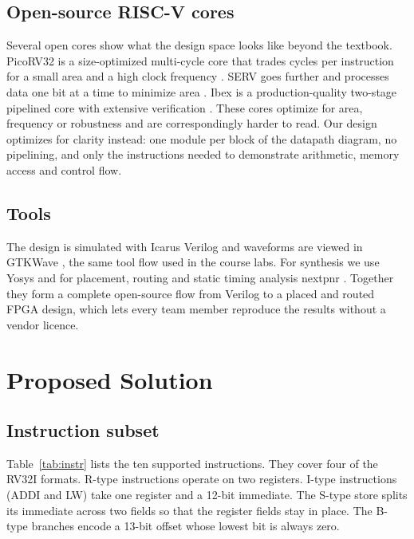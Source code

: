 \documentclass[conference]{IEEEtran}
\begin{document}
\subsection{Open-source RISC-V cores}
Several open cores show what the design space looks like beyond the textbook.
PicoRV32 is a size-optimized multi-cycle core that trades cycles per
instruction for a small area and a high clock frequency \cite{picorv32}. SERV
goes further and processes data one bit at a time to minimize area
\cite{serv}. Ibex is a production-quality two-stage pipelined core with
extensive verification \cite{ibex}. These cores optimize for area,
frequency or robustness and are correspondingly harder to read. Our design
optimizes for clarity instead: one module per block of the datapath diagram,
no pipelining, and only the instructions needed to demonstrate arithmetic,
memory access and control flow.

\subsection{Tools}
The design is simulated with Icarus Verilog \cite{iverilog} and waveforms are
viewed in GTKWave \cite{gtkwave}, the same tool flow used in the course labs.
For synthesis we use Yosys \cite{yosys} and for placement, routing and static
timing analysis nextpnr \cite{nextpnr}. Together they form a complete
open-source flow from Verilog to a placed and routed FPGA design, which lets
every team member reproduce the results without a vendor licence.

\section{Proposed Solution}

\subsection{Instruction subset}
Table~\ref{tab:instr} lists the ten supported instructions. They cover four
of the RV32I formats. R-type instructions operate on two registers. I-type
instructions (ADDI and LW) take one register and a 12-bit immediate. The
S-type store splits its immediate across two fields so that the register
fields stay in place. The B-type branches encode a 13-bit offset whose lowest
bit is always zero.
\end{document}
